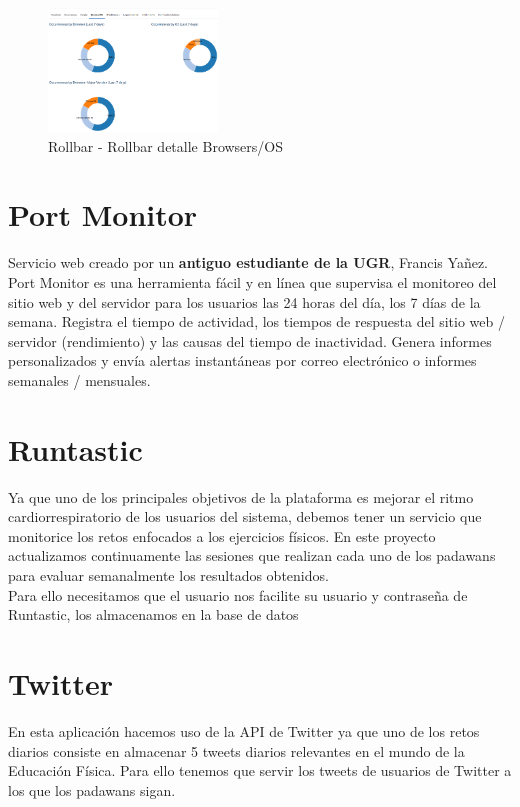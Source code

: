 \begin{figure}[ht]
	\centering
	\includegraphics[width=0.4\textwidth]{imagenes/tecnologias/rollbar_error_browser_os.png}
	\caption{Rollbar - Rollbar detalle Browsers/OS}
	\label{rollbar_error_browser_os}
\end{figure}

\newpage

\section{Port Monitor \cite{PortMonitor}}
Servicio web creado por un \textbf{antiguo estudiante de la UGR}, Francis Yañez. Port Monitor es una herramienta fácil y en línea que supervisa el monitoreo del sitio web y del servidor para los usuarios las 24 horas del día, los 7 días de la semana. Registra el tiempo de actividad, los tiempos de respuesta del sitio web / servidor (rendimiento) y las causas del tiempo de inactividad. Genera informes personalizados y envía alertas instantáneas por correo electrónico o informes semanales / mensuales.

\section{Runtastic}
Ya que uno de los principales objetivos de la plataforma es mejorar el ritmo cardiorrespiratorio de los usuarios del sistema, debemos tener un servicio que monitorice los retos enfocados a los ejercicios físicos. En este proyecto actualizamos continuamente las sesiones que realizan cada uno de los padawans para evaluar semanalmente los resultados obtenidos.\\

Para ello necesitamos que el usuario nos facilite su usuario y contraseña de Runtastic, los almacenamos en la base de datos

\newpage

\section{Twitter}
En esta aplicación hacemos uso de la API de Twitter ya que uno de los retos diarios consiste en almacenar 5 tweets diarios relevantes en el mundo de la Educación Física. Para ello tenemos que servir los tweets de usuarios de Twitter a los que los padawans sigan.\\


